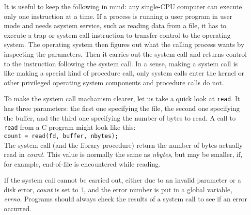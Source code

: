 \documentclass{book}
\newcommand {\sys} [1] {\textsl{#1}}
\newcommand {\cmd} [1] {\texttt{#1}}
\begin{document}
It is useful to keep the following in mind: any single-CPU computer can execute only one instruction at a time.
If a process is running a user program in user mode and needs asystem service, such as reading data from a file, 
it has to execute a trap or system call instruction to transfer control to the operating system.
The operating system then figures out what the calling process wants by inspecting the parameters.
Then it carries out the system call and returns control to the instruction following the system call.
In a sense, making a system call is like making a special kind of procedure call, 
only system calls enter the kernel or other privileged operating system components and procedure calls do not.

To make the system call machanism clearer, let us take a quick look at \cmd{read}.
It has three parameters: 
the first one specifying the file, the second one specifying the buffer, and the third one specifying the number of bytes to read.
A call to \cmd{read} from a C program might look like this:\\
\cmd{count = read(fd, buffer, nbytes);}\\
The system call (and the library procedure) return the number of bytes actually read in \sys{count}.
This value is normally the same as \sys{nbytes}, but may be smaller, if, for example, end-of-file is encountered while reading.

If the system call cannot be carried out, either due to an invalid parameter or a disk error, \sys{count} is set to 1, 
and the error number is put in a global variable, \sys{errno}.
Programs should always check the results of a system call to see if an error occurred.
\end{document}
